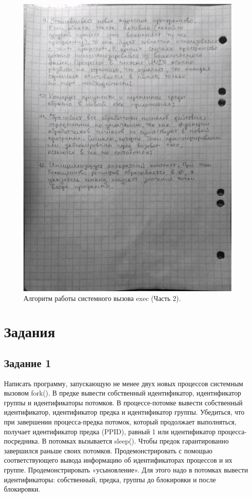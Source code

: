 \begin{figure}[ht]
	\centering
	\includegraphics[width=0.7\linewidth]{img/exec2.jpg}
	\caption{Алгоритм работы системного вызова exec (Часть 2).}
\end{figure}

\clearpage

\chapter{Задания}

\section{Задание 1}

Написать программу, запускающую не менее двух новых процессов системным вызовом fork(). В предке вывести собственный идентификатор, идентификатор группы и идентификаторы потомков. В процессе-потомке вывести собственный идентификатор, идентификатор предка и идентификатор группы. Убедиться, что при завершении процесса-предка потомок, который продолжает выполняться, получает идентификатор предка (PPID), равный 1 или идентификатор процесса-посредника. В потомках вызывается sleep(). Чтобы предок гарантированно завершился раньше своих потомков. Продемонстрировать с помощью соответствующего вывода информацию об идентификаторах процессов и их группе. Продемонстрировать «усыновление». Для этого надо в потомках вывести идентификаторы: собственный, предка, группы до блокировки и после блокировки.

